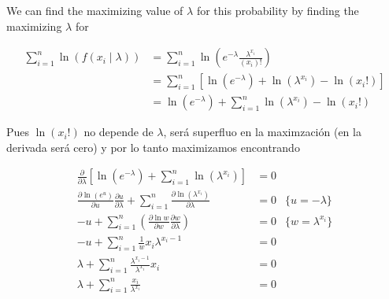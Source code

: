 \documentclass[a4paper, 12pt]{article}
\begin{document}
We can find the maximizing value of $\lambda$ for this probability by finding
the maximizing $\lambda$ for 

\begin{align*}
    \sum_{i=1}^{n} \ln \left( f(x_i \mid \lambda) \right) &= \sum_{i=1}^{n} \ln
    \left( e^{-\lambda} \frac{\lambda^{x_i}}{(x_i)!} \right)  \\ 
                                                          &= \sum_{i=1}^{n}
                                                          \left[\ln(e^{-\lambda}) +
                                                          \ln(\lambda^{x_i}) -
                                                      \ln( x_i! )\right] \\ 
                                                          &= \ln(e^{-\lambda}) +
                                                          \sum_{i=1}^{n}
                                                          \ln(\lambda^{x_i}) -
                                                          \ln(x_i!)
\end{align*}

Pues $\ln(x_i!)$  no depende de $\lambda$, será superfluo en la maximzación (en
la derivada será cero) y por lo tanto maximizamos encontrando

\begin{align*}
    \frac{\partial }{\partial \lambda} \left[\ln(e^{-\lambda}) + \sum_{i=1}^{n}
    \ln(\lambda^{x_i})\right] &= 0 \\ 
    \frac{\partial \ln(e^u)}{\partial u}\frac{\partial u}{\partial \lambda} +
    \sum_{i=1}^{n} \frac{\partial \ln(\lambda^{x_i})}{\partial \lambda } &= 0
                                                                         &\{u =
                                                                         -\lambda\}
                                                                         \\ 
    -u + \sum_{i=1}^{n} \left( \frac{\partial \ln w}{\partial w}\frac{\partial
w}{\partial \lambda} \right) &= 0 &\{w = \lambda^{x_i}\} \\ 
-u + \sum_{i=1}^{n} \frac{1}{w} x_i\lambda^{x_i - 1} &= 0 \\ 
\lambda + \sum_{i=1}^{n} \frac{\lambda^{x_i - 1}}{\lambda^{x_i}}x_i &= 0 \\ 
\lambda + \sum_{i=1}^{n} \frac{x_i}{\lambda^{x_i}} &= 0
\end{align*}
\end{document}
